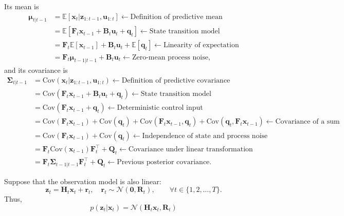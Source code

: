 \documentclass[../Bayesian_Inference.tex]{subfiles}
\begin{document}
Its mean is
\[
\begin{aligned}
    \bm{\mu}_{t|t-1} & = \mathbb{E}[\bm{x}_t | \bm{z}_{1:t-1}, \bm{u}_{1:t}] \leftarrow \text{Definition of predictive mean} \\
    & = \mathbb{E}[\mathbf{F}_t \bm{x}_{t-1} + \mathbf{B}_t \bm{u}_t + \bm{q}_t] \leftarrow \text{State transition model} \\
    & = \mathbf{F}_t \mathbb{E}[\bm{x}_{t-1}] + \mathbf{B}_t \bm{u}_t + \mathbb{E}[\bm{q}_t] \leftarrow \text{Linearity of expectation} \\
    & = \mathbf{F}_t \bm{\mu}_{t-1 | t-1} + \mathbf{B}_t \bm{u}_t \leftarrow \text{Zero-mean process noise},
\end{aligned}
\]
and its covariance is
\[
\begin{aligned}
    \mathbf{\Sigma}_{t | t-1} & = \mathrm{Cov}(\bm{x}_t | \bm{z}_{1:t-1}, \bm{u}_{1:t}) \leftarrow \text{Definition of predictive covariance} \\
    & = \mathrm{Cov}(\mathbf{F}_t \bm{x}_{t-1} + \mathbf{B}_t \bm{u}_t + \bm{q}_t)\leftarrow \text{State transition model} \\
    & = \mathrm{Cov}(\mathbf{F}_t \bm{x}_{t-1} + \bm{q}_t)\leftarrow \text{Deterministic control input} \\
    & = \mathrm{Cov}(\mathbf{F}_t \bm{x}_{t-1}) + \mathrm{Cov}(\bm{q}_t) + \mathrm{Cov}(\mathbf{F}_t \bm{x}_{t-1}, \bm{q}_t) + \mathrm{Cov}(\bm{q}_t, \mathbf{F}_t \bm{x}_{t-1})\leftarrow \text{Covariance of a sum} \\
    & = \mathrm{Cov}(\mathbf{F}_t \bm{x}_{t-1}) + \mathrm{Cov}(\bm{q}_t)  \leftarrow \text{Independence of state and process noise} \\
    & = \mathbf{F}_t \mathrm{Cov}(\bm{x}_{t-1}) \mathbf{F}_t^{\top} + \mathbf{Q}_{t} \leftarrow \text{Covariance under linear transformation} \\
    & = \mathbf{F}_t \mathbf{\Sigma}_{t-1 | t-1} \mathbf{F}_t^{\top} + \mathbf{Q}_{t} \leftarrow \text{Previous posterior covariance}.
\end{aligned}
\]


Suppose that the observation model is also linear:
\[
    \bm{z}_t = \mathbf{H}_t \bm{x}_t + \bm{r}_t, \quad \bm{r}_t \sim \mathcal{N}(\bm{0}, \mathbf{R}_t), \qquad \forall t \in \{1, 2, \dots, T\}.
\]
Thus,
\[
    p(\bm{z}_t | \bm{x}_t) = \mathcal{N}(\mathbf{H}_t \bm{x}_t, \mathbf{R}_t)
\]
\end{document}
